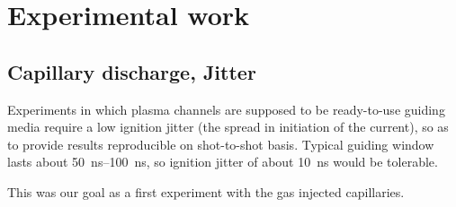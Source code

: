 \documentclass[justified,nofonts,nobib]{tufte-book}
\begin{document}
\chapter{Experimental work}\label{chap:Experimental_work}
\section{Capillary discharge, Jitter}\label{sec:jitter}
Experiments in which plasma channels are supposed to be ready-to-use guiding media require a low ignition jitter (the spread in initiation of the current), so as to provide results reproducible on shot-to-shot basis. Typical guiding window lasts about \SIrange{50}{100}{\ns}, so ignition jitter of about \SI{10}{ns} would be tolerable.

This was our goal as a first experiment with the gas injected capillaries.
\end{document}
